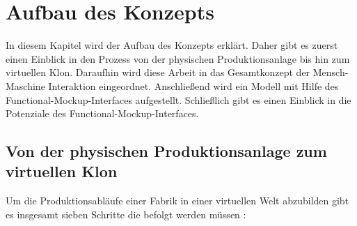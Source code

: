\chapter{Aufbau des Konzepts}\label{cha:AufbauDesKonzepts}

In diesem Kapitel wird der Aufbau des Konzepts erklärt. Daher gibt es zuerst einen Einblick in den Prozess von der physischen Produktionsanlage bis hin zum virtuellen Klon. Daraufhin wird diese Arbeit in das Gesamtkonzept der Mensch-Maschine Interaktion eingeordnet. Anschließend wird ein Modell mit Hilfe des Functional-Mockup-Interfaces aufgestellt. Schließlich gibt es einen Einblick in die Potenziale des Functional-Mockup-Interfaces.

\section{Von der physischen Produktionsanlage zum virtuellen Klon}\label{sec:PhysischZumKlon}

Um die Produktionsabläufe einer Fabrik in einer virtuellen Welt abzubilden gibt es insgesamt sieben Schritte die befolgt werden müssen \cite{34}:

